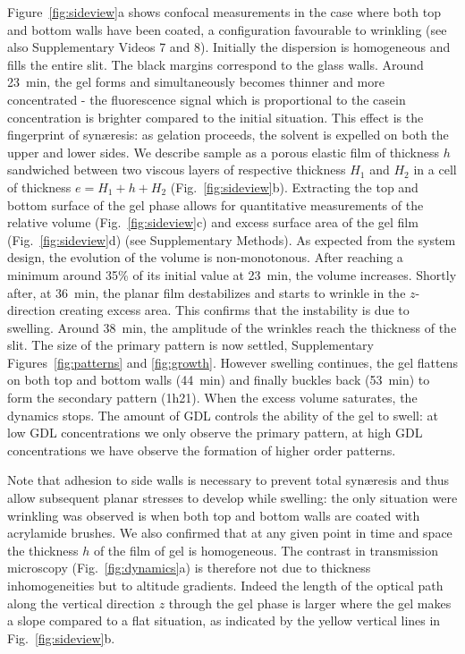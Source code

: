 \documentclass[twocolumn,superscriptaddress,showpacs,preprintnumbers,
amsmath,amssymb,prl]{revtex4-1}
\begin{document}
Figure~\ref{fig:sideview}a shows confocal measurements in the case where both top and bottom walls have been coated, a configuration favourable to wrinkling (see also Supplementary Videos 7 and 8). Initially the dispersion is homogeneous and fills the entire slit. The black margins correspond to the glass walls. Around \SI{23}{\minute}, the gel forms and simultaneously becomes thinner and more concentrated - the fluorescence signal which is proportional to the casein concentration is brighter compared to the initial situation. This effect is the fingerprint of syn\ae{}resis: as gelation proceeds, the solvent is expelled on both the upper and lower sides. We describe sample as a porous elastic film of thickness $h$ sandwiched between two viscous layers of respective thickness $H_1$ and $H_2$ in a cell of thickness $e=H_1+h+H_2$ (Fig.~\ref{fig:sideview}b). Extracting the top and bottom surface of the gel phase allows for quantitative measurements of the relative volume (Fig.~\ref{fig:sideview}c) and excess surface area of the gel film (Fig.~\ref{fig:sideview}d) (see Supplementary Methods). As expected from the system design, the evolution of the volume is non-monotonous. After reaching a minimum around 35\% of its initial value at \SI{23}{\minute}, the volume increases. Shortly after,  at \SI{36}{\minute}, the planar film destabilizes and starts to wrinkle in the $z$-direction creating excess area. This confirms that the instability is due to swelling. Around \SI{38}{\minute}, the amplitude of the wrinkles reach the thickness of the slit. The size of the primary pattern is now settled, Supplementary Figures~\ref{fig:patterns} and \ref{fig:growth}. However swelling continues, the gel flattens on both top and bottom walls (\SI{44}{\minute}) and finally buckles back (\SI{53}{\minute}) to form the secondary pattern (1h21). When the excess volume saturates, the dynamics stops. The amount of GDL controls the ability of the gel to swell: at low GDL concentrations we only observe the primary pattern, at high GDL concentrations we have observe the formation of higher order patterns. 

Note that adhesion to side walls is necessary to prevent total syn\ae{}resis and thus allow subsequent planar stresses to develop while swelling: the only situation were wrinkling was observed is when both top and bottom walls are coated with acrylamide brushes. We also confirmed that at any given point in time and space the thickness $h$ of the film of gel is homogeneous. The contrast in transmission microscopy (Fig.~\ref{fig:dynamics}a) is therefore not due to thickness inhomogeneities but to altitude gradients. Indeed the length of the optical path along the vertical direction $z$ through the gel phase is larger where the gel makes a slope compared to a flat situation, as indicated by the yellow vertical lines in Fig.~\ref{fig:sideview}b.
\end{document}
